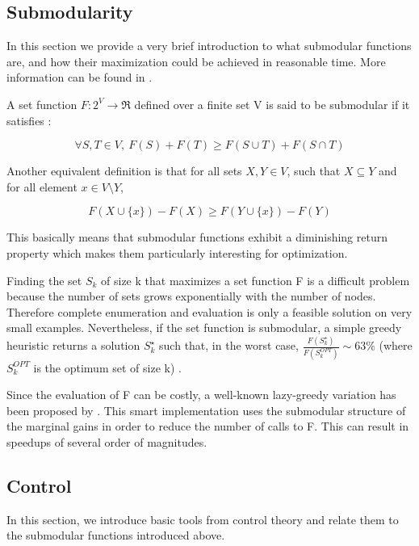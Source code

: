 \documentclass[conference]{IEEEtran}
\begin{document}
\subsection{Submodularity}

In this section we provide a very brief introduction to what submodular functions are, and how their maximization could be achieved in reasonable time. More information can be found in \cite{Krause2014}.

 A set function $ F:2^{V} \longrightarrow \Re $ defined over a finite set V is said to be submodular if it satisfies :

\begin{equation}
\forall S,T \in V,\ F(S) + F(T) \geq F(S \cup T) + F(S \cap T)
\end{equation}

Another equivalent definition is that for all sets $ X, Y \in V$, such that $ X \subseteq Y$ and for all element $ x \in V \setminus Y$,

\begin{equation}
F(X \cup \{ x \} ) - F(X) \geq F(Y \cup \{ x \} ) - F(Y)
\end{equation} 

This basically means that submodular functions exhibit a diminishing return property which makes them particularly interesting for optimization.

Finding the set $ S_k $ of size k that maximizes a set function F is a difficult problem because the number of sets grows exponentially with the number of nodes. Therefore complete enumeration and evaluation is only a feasible solution on very small examples. Nevertheless, if the set function is submodular, a simple greedy heuristic returns a solution $ S_k^{\star} $ such that, in the worst case, $ \frac{F(S_k^{\star})}{F(S_k^{OPT})} \sim 63\%$ (where $ S_k^{OPT}$ is the optimum set of size k) \cite{Krause2014}. 

Since the evaluation of F can be costly, a well-known lazy-greedy variation has been proposed by \cite{Minoux}. This smart implementation uses the submodular structure of the marginal gains in order to reduce the number of calls to F. This can result in speedups of several order of magnitudes.


\subsection{Control}

In this section, we introduce basic tools from control theory and relate them to the submodular functions introduced above. 
\end{document}
